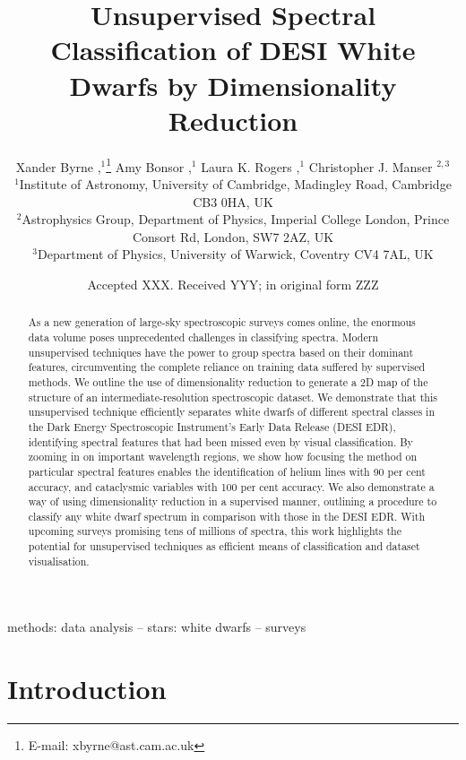 \documentclass[fleqn,usenatbib]{mnras}
\title[
    Unsupervised WD Spectral Classification
]{
    Unsupervised Spectral Classification of DESI White Dwarfs by Dimensionality Reduction
}
\author[
    X. Byrne et al.
]{
    Xander Byrne
    \orcidlink{0000-0001-9488-238X},$^{1}$\thanks{E-mail: xbyrne@ast.cam.ac.uk}
    Amy Bonsor
    \orcidlink{0000-0002-8070-1901},$^{1}$
    Laura K. Rogers
    \orcidlink{0000-0002-3553-9474},$^{1}$
    Christopher J. Manser
    \orcidlink{0000-0003-1543-5405}$^{2,3}$
\\
$^{1}$Institute of Astronomy,
University of Cambridge,
Madingley Road,
Cambridge CB3 0HA,
UK\\
$^{2}$Astrophysics Group,
Department of Physics,
Imperial College London,
Prince Consort Rd,
London,
SW7 2AZ,
UK\\
$^{3}$Department of Physics,
University of Warwick,
Coventry CV4 7AL,
UK
}
\date{Accepted XXX. Received YYY; in original form ZZZ}
\begin{document}
\label{firstpage}
\pagerange{\pageref{firstpage}--\pageref{lastpage}}
\maketitle

\begin{abstract}
As a new generation of large-sky spectroscopic surveys comes online, the enormous data volume poses unprecedented challenges in classifying spectra. 
Modern unsupervised techniques have the power to group spectra based on their dominant features, circumventing the complete reliance on training data suffered by supervised methods.
We outline the use of dimensionality reduction to generate a 2D map of the structure of an intermediate-resolution spectroscopic dataset.
We demonstrate that this unsupervised technique efficiently separates white dwarfs of different spectral classes in the Dark Energy Spectroscopic Instrument's Early Data Release (DESI EDR), identifying spectral features that had been missed even by visual classification.
By zooming in on important wavelength regions, we show how focusing the method on particular spectral features enables the identification of helium lines with 90 per cent accuracy, and cataclysmic variables with 100 per cent accuracy.
We also demonstrate a way of using dimensionality reduction in a supervised manner, outlining a procedure to classify any white dwarf spectrum in comparison with those in the DESI EDR.
With upcoming surveys promising tens of millions of spectra, this work highlights the potential for unsupervised techniques as efficient means of classification and dataset visualisation.
\end{abstract}

\begin{keywords}
methods: data analysis -- stars: white dwarfs -- surveys
\end{keywords}



\section{Introduction}
\end{document}
